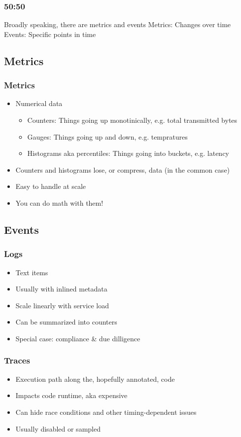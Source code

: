 \documentclass[t]{beamer}
\begin{document}
\begin{frame}
	\frametitle{50:50}
	\begin{center}
		\vfill
		Broadly speaking, there are metrics and events
		\vfill
		Metrics: Changes over time
		\vfill
		Events: Specific points in time
		\vfill
	\end{center}
\end{frame}


\subsection{Metrics}

\begin{frame}
	\frametitle{Metrics}
	\begin{itemize}
		\item Numerical data
		\begin{itemize}
			\item Counters: Things going up monotinically, e.g. total transmitted bytes
			\item Gauges: Things going up and down, e.g. tempratures
			\item Histograms aka percentiles: Things going into buckets, e.g. latency
		\end{itemize}
		\item Counters and histograms lose, or compress, data (in the common case)
		\item Easy to handle at scale
		\item You can do math with them!
	\end{itemize}
\end{frame}


\subsection{Events}

\begin{frame}
	\frametitle{Logs}
	\begin{itemize}
		\item Text items
		\item Usually with inlined metadata
		\item Scale linearly with service load
		\item Can be summarized into counters
		\item Special case: compliance \& due dilligence
	\end{itemize}
\end{frame}

\begin{frame}
	\frametitle{Traces}
	\begin{itemize}
		\item Execution path along the, hopefully annotated, code
		\item Impacts code runtime, aka expensive
		\item Can hide race conditions and other timing-dependent issues
		\item Usually disabled or sampled
	\end{itemize}
\end{frame}
\end{document}
